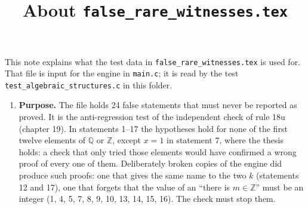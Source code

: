 \documentclass[11pt,a4paper]{article}
\title{About \texttt{false\_rare\_witnesses.tex}}
\author{}
\date{}
\begin{document}
\maketitle
This note explains what the test data in \texttt{false\_rare\_witnesses.tex} is used for. That file is input for the engine in \texttt{main.c}; it is read by the test \texttt{test\_algebraic\_structures.c} in this folder.

\begin{enumerate}
\item \textbf{Purpose.} The file holds 24 false statements that must never be reported as proved. It is the anti-regression test of the independent check of rule 18u (chapter 19). In statements 1--17 the hypotheses hold for none of the first twelve elements of $\mathbb{Q}$ or $\mathbb{Z}$, except $x = 1$ in statement 7, where the thesis holds: a check that only tried those elements would have confirmed a wrong proof of every one of them. Deliberately broken copies of the engine did produce such proofs: one that gives the same name to the two $k$ (statements 12 and 17), one that forgets that the value of an ``there is $m \in \mathbb{Z}$'' must be an integer (1, 4, 5, 7, 8, 9, 10, 13, 14, 15, 16). The check must stop them.


\end{enumerate}
\end{document}
